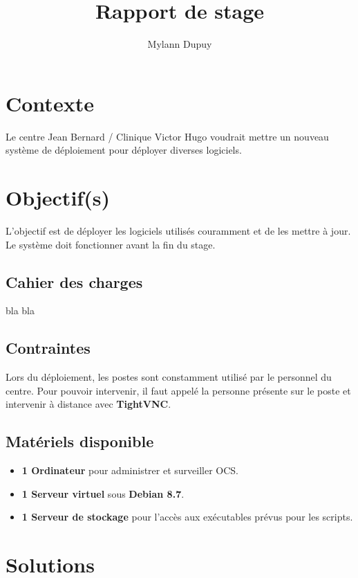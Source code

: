 \documentclass[11pt,a4paper,oneside]{article}
\author{Mylann Dupuy}
\title{Rapport de stage}
\begin{document}
\maketitle
\newpage
\tableofcontents
\newpage
\section{Contexte}
Le centre Jean Bernard / Clinique Victor Hugo voudrait mettre un nouveau système de déploiement pour déployer diverses logiciels.
\section{Objectif(s)}
L'objectif est de déployer les logiciels utilisés couramment et de les mettre à jour. Le système doit fonctionner avant la fin du stage. 
\subsection{Cahier des charges}
bla bla
\\
\subsection{Contraintes}
Lors du déploiement, les postes sont constamment utilisé par le personnel du centre. Pour pouvoir intervenir, il faut appelé la personne présente sur le poste et intervenir à distance avec \textbf{TightVNC}.
\subsection{Matériels disponible}
\begin{itemize}
	\item \textbf{1 Ordinateur} pour administrer et surveiller OCS.
	\item \textbf{1 Serveur virtuel} sous 	\textbf{Debian 8.7}.
	\item \textbf{1 Serveur de stockage}  pour l'accès aux exécutables prévus pour les scripts. 

\end{itemize}
\newpage
\section{Solutions}
\end{document}
